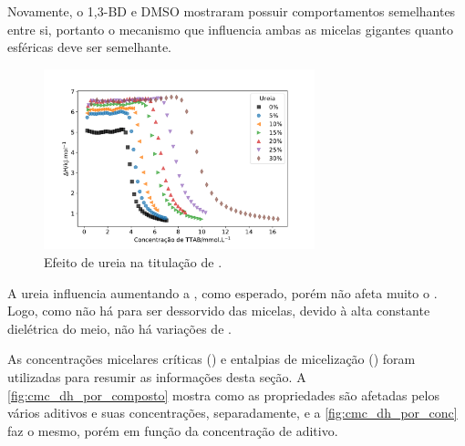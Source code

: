 			Novamente, o 1,3-BD e DMSO mostraram possuir comportamentos semelhantes entre si, portanto o mecanismo que influencia ambas as micelas gigantes quanto esféricas deve ser semelhante.
			
			\begin{figure}[h]
				\centering
				\includegraphics[width=0.7\textwidth]{imagens/itc/ITC_ur}
				\caption{Efeito de ureia na titulação de \TTAB.}
				\label{fig:itc_ureia}
			\end{figure}
		
		A ureia influencia aumentando a \cmc{}, como esperado, porém não afeta muito o \DHmic{}. Logo, como não há \Sal{} para ser dessorvido das micelas, devido à alta constante dielétrica do meio, não há variações de \DHmic.
		
		As concentrações micelares críticas (\cmc) e entalpias de micelização (\DHmic) foram utilizadas para resumir as informações desta seção. A \autoref{fig:cmc_dh_por_composto} mostra como as propriedades são afetadas pelos vários aditivos e suas concentrações, separadamente, e a \autoref{fig:cmc_dh_por_conc} faz o mesmo, porém em função da concentração de aditivo.
		
